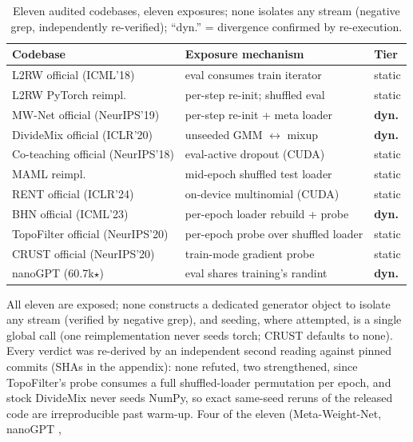 \begin{table}[t]
\centering
\scriptsize
\setlength{\tabcolsep}{2.2pt}
\begin{tabular}{@{}p{}p{}p{}@{}}
\toprule
Codebase & Exposure mechanism & Tier \\
\midrule
L2RW official (ICML'18) & eval consumes train iterator & static \\
L2RW PyTorch reimpl. & per-step re-init; shuffled eval & static \\
MW-Net official (NeurIPS'19) & per-step re-init + meta loader & \textbf{dyn.} \\
DivideMix official (ICLR'20) & unseeded GMM $\leftrightarrow$ mixup & \textbf{dyn.} \\
Co-teaching official (NeurIPS'18) & eval-active dropout (CUDA) & static \\
MAML reimpl. \citep{finn2017maml} & mid-epoch shuffled test loader & static \\
RENT official (ICLR'24) & on-device multinomial (CUDA) & static \\
BHN official (ICML'23) & per-epoch loader rebuild + probe & \textbf{dyn.} \\
TopoFilter official (NeurIPS'20) & per-epoch probe over shuffled loader & static \\
CRUST official (NeurIPS'20) & train-mode gradient probe & static \\
nanoGPT (60.7k$\star$) & eval shares training's randint & \textbf{dyn.} \\
\bottomrule
\end{tabular}
\caption{Eleven audited codebases, eleven exposures; none isolates any
stream (negative grep, independently re-verified); ``dyn.'' = divergence
confirmed by re-execution.}
\label{tab:audit}
\end{table}
All eleven are exposed; none
constructs a dedicated generator object to isolate any stream (verified by
negative grep), and seeding, where attempted, is a single global call
(one reimplementation never seeds torch; CRUST \citep{mirzasoleiman2020crust} defaults to none). Every
verdict was re-derived by an independent second reading against
pinned commits (SHAs in the appendix): none refuted, two strengthened, since
TopoFilter's \citep{wu2020topofilter} probe consumes a full shuffled-loader permutation per
epoch, and stock DivideMix never seeds NumPy, so exact same-seed reruns
of the released code are irreproducible past warm-up. Four of the
eleven (Meta-Weight-Net, nanoGPT \citep{karpathy2022nanogpt},
